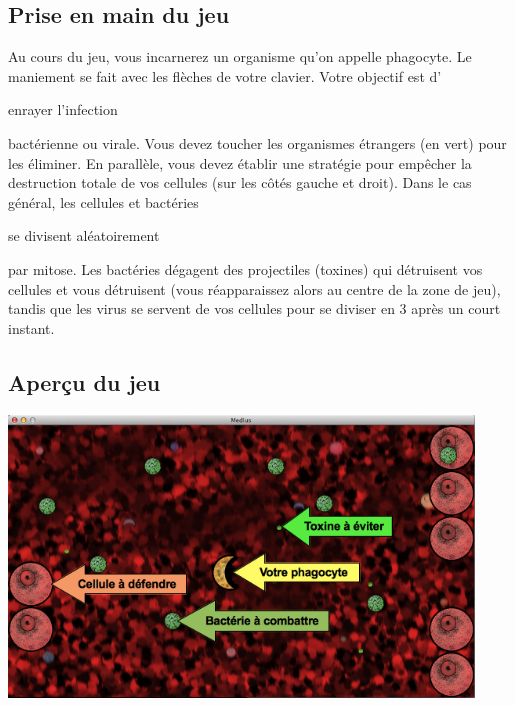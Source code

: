 \documentclass{article}
\begin{document}
\subsection{Prise en main du jeu}

Au cours du jeu, vous incarnerez un organisme qu'on appelle phagocyte. Le maniement se fait avec les flèches de votre clavier.
\newline\newline
Votre objectif est d'\begin{bfseries}enrayer l'infection\end{bfseries} bactérienne ou virale. Vous devez toucher les organismes étrangers (en vert) pour les éliminer.
\newline\newline
En parallèle, vous devez établir une stratégie pour empêcher la destruction totale de vos cellules (sur les côtés gauche et droit).
\newline\newline
Dans le cas général, les cellules et bactéries \begin{bfseries}se divisent aléatoirement\end{bfseries} par mitose.
\newline\newline
Les bactéries dégagent des projectiles (toxines) qui détruisent vos cellules et vous détruisent (vous réapparaissez alors au centre de la zone de jeu), tandis que les virus se servent de vos cellules pour se diviser en 3 après un court instant.
\newline\newline

\subsection{Aperçu du jeu}

\centerline{\includegraphics[height=7.5cm]{game_help.png}}
\strut\newline
\end{document}
